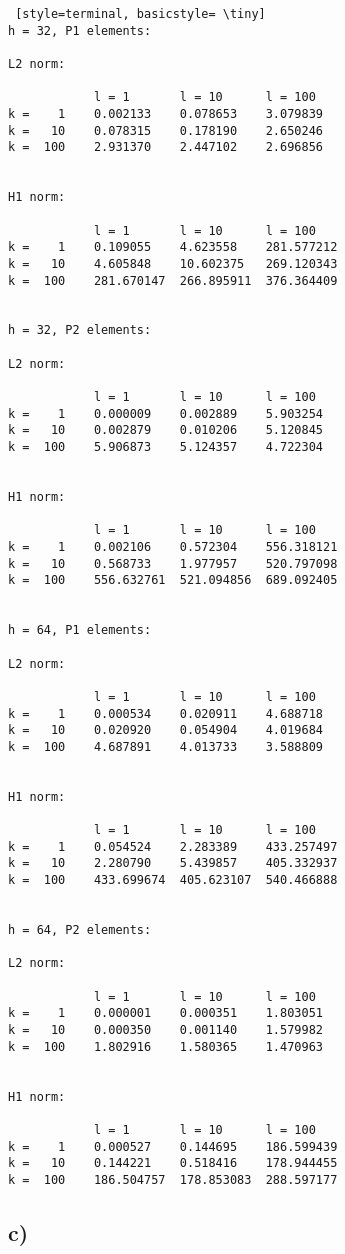 \documentclass[a4paper,english,12pt,twoside]{article}
\begin{document}
\begin{lstlisting} [style=terminal, basicstyle= \tiny]
h = 32, P1 elements:

L2 norm:

           	l = 1    	l = 10    	l = 100
k =    1	0.002133	0.078653	3.079839
k =   10	0.078315	0.178190	2.650246
k =  100	2.931370	2.447102	2.696856


H1 norm:

           	l = 1    	l = 10    	l = 100
k =    1	0.109055	4.623558	281.577212
k =   10	4.605848	10.602375	269.120343
k =  100	281.670147	266.895911	376.364409


h = 32, P2 elements:

L2 norm:

           	l = 1    	l = 10    	l = 100
k =    1	0.000009	0.002889	5.903254
k =   10	0.002879	0.010206	5.120845
k =  100	5.906873	5.124357	4.722304


H1 norm:

           	l = 1    	l = 10    	l = 100
k =    1	0.002106	0.572304	556.318121
k =   10	0.568733	1.977957	520.797098
k =  100	556.632761	521.094856	689.092405


h = 64, P1 elements:

L2 norm:

           	l = 1    	l = 10    	l = 100
k =    1	0.000534	0.020911	4.688718
k =   10	0.020920	0.054904	4.019684
k =  100	4.687891	4.013733	3.588809


H1 norm:

           	l = 1    	l = 10    	l = 100
k =    1	0.054524	2.283389	433.257497
k =   10	2.280790	5.439857	405.332937
k =  100	433.699674	405.623107	540.466888


h = 64, P2 elements:

L2 norm:

           	l = 1    	l = 10    	l = 100
k =    1	0.000001	0.000351	1.803051
k =   10	0.000350	0.001140	1.579982
k =  100	1.802916	1.580365	1.470963


H1 norm:

           	l = 1    	l = 10    	l = 100
k =    1	0.000527	0.144695	186.599439
k =   10	0.144221	0.518416	178.944455
k =  100	186.504757	178.853083	288.597177
\end{lstlisting}

\subsection*{c)}
\end{document}
